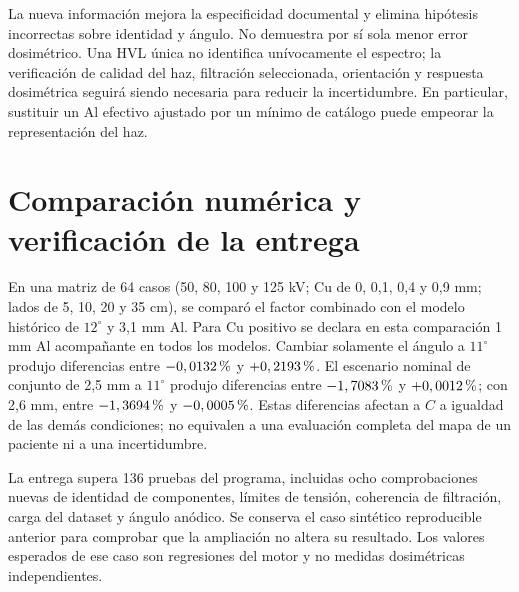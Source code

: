 La nueva información mejora la especificidad documental y elimina hipótesis incorrectas sobre identidad y ángulo. No demuestra por sí sola menor error dosimétrico. Una HVL única no identifica unívocamente el espectro; la verificación de calidad del haz, filtración seleccionada, orientación y respuesta dosimétrica seguirá siendo necesaria para reducir la incertidumbre. En particular, sustituir un Al efectivo ajustado por un mínimo de catálogo puede empeorar la representación del haz.

\section{Comparación numérica y verificación de la entrega}
En una matriz de 64 casos (50, 80, 100 y 125 kV; Cu de 0, 0,1, 0,4 y 0,9 mm; lados de 5, 10, 20 y 35 cm), se comparó el factor combinado con el modelo histórico de $12^\circ$ y 3,1 mm Al. Para Cu positivo se declara en esta comparación 1 mm Al acompañante en todos los modelos. Cambiar solamente el ángulo a $11^\circ$ produjo diferencias entre $-0,0132\,\text{\char37}$ y $+0,2193\,\text{\char37}$. El escenario nominal de conjunto de 2,5 mm a $11^\circ$ produjo diferencias entre $-1,7083\,\text{\char37}$ y $+0,0012\,\text{\char37}$; con 2,6 mm, entre $-1,3694\,\text{\char37}$ y $-0,0005\,\text{\char37}$. Estas diferencias afectan a $C$ a igualdad de las demás condiciones; no equivalen a una evaluación completa del mapa de un paciente ni a una incertidumbre.

La entrega supera 136 pruebas del programa, incluidas ocho comprobaciones nuevas de identidad de componentes, límites de tensión, coherencia de filtración, carga del dataset y ángulo anódico. Se conserva el caso sintético reproducible anterior para comprobar que la ampliación no altera su resultado. Los valores esperados de ese caso son regresiones del motor y no medidas dosimétricas independientes.
